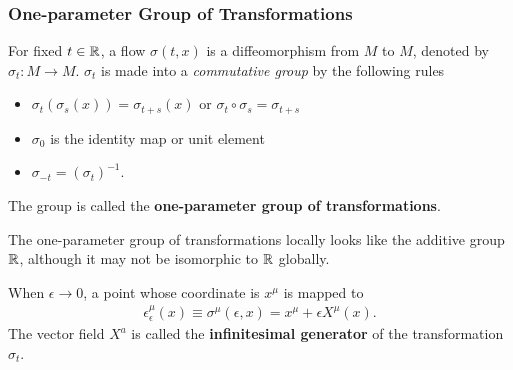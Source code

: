 \documentclass[10pt]{article}
\begin{document}
\subsubsection{One-parameter Group of Transformations}
\begin{definition}
    For fixed $t\in\mathbb{R}$, a flow $\sigma(t,x)$ is a diffeomorphism from $M$ to $M$, denoted by $\sigma_t:M\to M$.
    $\sigma_t$ is made into a \textit{commutative group} by the following rules
    \begin{itemize}
        \item $\sigma_t(\sigma_s(x))=\sigma_{t+s}(x)$ or $\sigma_t\circ\sigma_s=\sigma_{t+s}$
        \item $\sigma_0$ is the identity map or unit element
        \item $\sigma_{-t}=(\sigma_t)^{-1}$.
    \end{itemize}
    The group is called the \textbf{one-parameter group of transformations}.
\end{definition}
\begin{remark}
    The one-parameter group of transformations locally looks like the additive group $\mathbb{R}$, although it may not be isomorphic to $\mathbb{R}$ globally.
\end{remark}

When $\epsilon\to0$, a point whose coordinate is $x^\mu$ is mapped to
\begin{align}
    \epsilon^{\mu}_\epsilon(x)\equiv\sigma^{\mu}(\epsilon,x)=x^\mu+\epsilon X^\mu(x).
\end{align}
The vector field $X^a$ is called the \textbf{infinitesimal generator} of the transformation $\sigma_t$.
\end{document}
